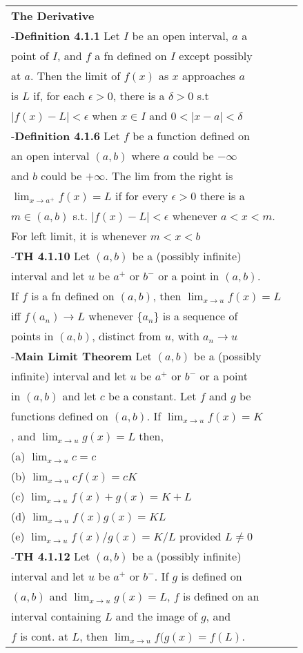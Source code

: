 \documentclass[10 pt,landscape]{article}
\begin{document}
\begin{multicols}{4}
\begin{tabular}{@{}ll@{}}
\textbf{The Derivative}\\
-\textbf{Definition 4.1.1} Let $I$ be an open interval, $a$ a \\point of $I$, and $f$ a fn defined on $I$ except possibly\\ at $a$. Then the limit of $f(x)$ as $x$ approaches $a$\\ is $L$ if, for each $\epsilon >0$, there is a $\delta > 0$ s.t\\ $|f(x)-L| < \epsilon$ when $x \in I$ and $0<|x-a|<\delta$\\
-\textbf{Definition 4.1.6} Let $f$ be a function defined on\\ an open interval $(a,b)$ where $a$ could be $-\infty$\\ and $b$ could be $+\infty$. The lim from the right is\\ $\lim_{x \to a^{+}} f(x)=L$ if for every $\epsilon >0 $ there is a \\ $m \in (a,b)$ s.t. $|f(x)-L|<\epsilon $ whenever $a<x<m$. \\
For left limit, it is whenever $m<x<b$\\
-\textbf{TH 4.1.10} Let $(a,b)$ be a (possibly infinite) \\interval
and let $u$ be $a^{+}$ or $b^{-}$ or a point in $(a,b)$. \\If $f$ is a fn
defined on $(a,b)$, then $\lim_{x \to u} f(x)=L$\\ iff  $f(a_n) \to L$ whenever $\{a_n\}$ is a sequence of \\points in $(a,b)$, distinct from $u$, with $a_n \to u$\\
-\textbf{Main Limit Theorem} Let $(a,b)$ be a (possibly \\ infinite) interval and let $u$ be $a^{+}$ or $b^{-}$ or a point \\in $(a,b)$ and let $c$ be a constant. Let $f$ and $g$ be \\ functions defined on $(a,b)$. If $\lim_{x \to u} f(x)=K$ \\, and $\lim_{x \to u} g(x)=L$ then,\\
(a) $\lim_{x \to u} c=c$\\
(b) $\lim_{x \to u} cf(x)=cK$\\
(c) $\lim_{x \to u} f(x)+g(x)=K+L$\\
(d) $\lim_{x \to u} f(x)g(x)=KL$\\
(e) $\lim_{x \to u} f(x)/g(x)=K/L$ provided $L \neq 0$\\
-\textbf{TH 4.1.12} Let $(a,b)$ be a (possibly infinite) \\interval and let $u$ be $a^{+}$ or $b^{-}$. If $g$ is defined on\\ $(a,b)$ and $\lim_{x \to u} g(x)=L$, $f$ is defined on an\\ interval containing $L$ and the image of $g$, and\\ $f$ is cont. at $L$, then $\lim_{x \to u} f(g(x)=f(L)$.\\
\end{tabular}


\end{multicols}
\end{document}
